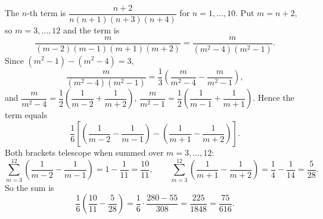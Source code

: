 The $n$-th term is $\dfrac{n+2}{n(n+1)(n+3)(n+4)}$ for $n=1,\dots,10$. Put $m=n+2$, so $m=3,\dots,12$ and the term is
\[
\dfrac{m}{(m-2)(m-1)(m+1)(m+2)}=\dfrac{m}{(m^2-4)(m^2-1)} .
\]
Since $(m^2-1)-(m^2-4)=3$,
\[
\dfrac{m}{(m^2-4)(m^2-1)}=\dfrac{1}{3}\left(\dfrac{m}{m^2-4}-\dfrac{m}{m^2-1}\right),
\]
and $\dfrac{m}{m^2-4}=\dfrac{1}{2}\left(\dfrac{1}{m-2}+\dfrac{1}{m+2}\right)$, $\dfrac{m}{m^2-1}=\dfrac{1}{2}\left(\dfrac{1}{m-1}+\dfrac{1}{m+1}\right)$. Hence the term equals
\[
\dfrac{1}{6}\left[\left(\dfrac{1}{m-2}-\dfrac{1}{m-1}\right)-\left(\dfrac{1}{m+1}-\dfrac{1}{m+2}\right)\right].
\]
Both brackets telescope when summed over $m=3,\dots,12$:
\[
\sum_{m=3}^{12}\left(\dfrac{1}{m-2}-\dfrac{1}{m-1}\right)=1-\dfrac{1}{11}=\dfrac{10}{11},\qquad
\sum_{m=3}^{12}\left(\dfrac{1}{m+1}-\dfrac{1}{m+2}\right)=\dfrac{1}{4}-\dfrac{1}{14}=\dfrac{5}{28}.
\]
So the sum is
\[
\dfrac{1}{6}\left(\dfrac{10}{11}-\dfrac{5}{28}\right)=\dfrac{1}{6}\cdot\dfrac{280-55}{308}=\dfrac{225}{1848}=\boxed{\dfrac{75}{616}} .
\]

